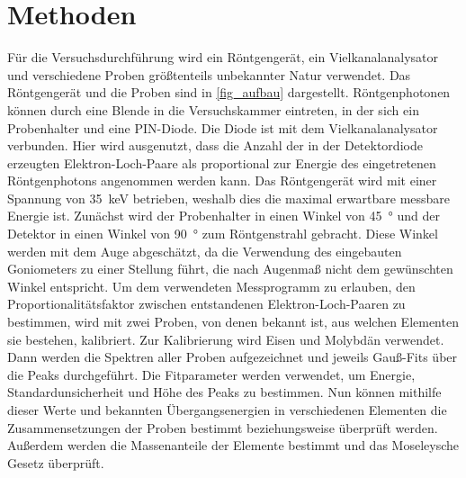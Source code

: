 \documentclass[
	a4paper,
	12pt,
	pagesize,
	ngerman
]{scrartcl}
\begin{document}
	\section{Methoden}
	Für die Versuchsdurchführung wird ein Röntgengerät, ein Vielkanalanalysator und verschiedene Proben größtenteils unbekannter Natur verwendet. %
	Das Röntgengerät und die Proben sind in \cref{fig_aufbau} dargestellt.
	Röntgenphotonen können durch eine Blende in die Versuchskammer eintreten, in der sich ein Probenhalter und eine PIN-Diode.
	Die Diode ist mit dem Vielkanalanalysator verbunden.
	Hier wird ausgenutzt, dass die Anzahl der in der Detektordiode erzeugten Elektron-Loch-Paare als proportional zur Energie des eingetretenen Röntgenphotons angenommen werden kann.
	Das Röntgengerät wird mit einer Spannung von \SI{35}{\kilo \electronvolt} betrieben, weshalb dies die maximal erwartbare messbare Energie ist.
	Zunächst wird der Probenhalter in einen Winkel von \SI{45}{\degree} und der Detektor in einen Winkel von \SI{90}{\degree} zum Röntgenstrahl gebracht.
	Diese Winkel werden mit dem Auge abgeschätzt, da die Verwendung des eingebauten Goniometers zu einer Stellung führt, die nach Augenmaß nicht dem gewünschten Winkel entspricht.
	Um dem verwendeten Messprogramm zu erlauben, den Proportionalitätsfaktor zwischen entstandenen Elektron-Loch-Paaren zu bestimmen, wird mit zwei Proben, von denen bekannt ist, aus welchen Elementen sie bestehen, kalibriert.
	Zur Kalibrierung wird Eisen und Molybdän verwendet.
	Dann werden die Spektren aller Proben aufgezeichnet und jeweils Gauß-Fits über die Peaks durchgeführt.
	Die Fitparameter werden verwendet, um Energie, Standardunsicherheit und Höhe des Peaks zu bestimmen.
	Nun können mithilfe dieser Werte und bekannten Übergangsenergien in verschiedenen Elementen die Zusammensetzungen der Proben bestimmt beziehungsweise überprüft werden. %
	Außerdem werden die Massenanteile der Elemente bestimmt und das Moseleysche Gesetz überprüft.
	
	
\end{document}
